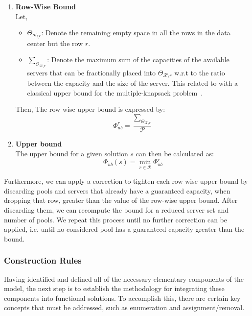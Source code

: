 \begin{enumerate}
  \item \textbf{Row-Wise Bound} \\
        Let,
        \begin{itemize}
          \item $\Theta_{\mathcal{R} \setminus r}$: Denote the remaining empty
                space in all the rows in the data center but the row $r$.
          \item $\sum_{\Theta_{\mathcal{R} \setminus r}}$: Denote the maximum
                sum of the capacities of the available servers that can be
                fractionally placed into $\Theta_{\mathcal{R} \setminus r}$ w.r.t to
                the ratio between the capacity and the size of the server. This related to
                with a classical upper bound for the multiple-knapsack problem~\cite{martello1981bound}.
        \end{itemize}
        Then,
        The row-wise upper bound is expressed by:
        \begin{equation}
          \Phi_{ub}^{r} = \frac{\sum_{\Theta_{\mathcal{R} \setminus r}}}{\mathcal{P}}
        \end{equation}
  \item \textbf{Upper bound}\\
        The upper bound for a given solution $s$ can then be calculated as:
        \begin{equation}
          \Phi_{ub}(s) = \min_{r \in \mathcal{R}} \Phi_{ub}^{r}
        \end{equation}
\end{enumerate}

Furthermore, we can apply a correction to tighten each row-wise upper bound by
discarding pools and servers that already have a guaranteed capacity, when
dropping that row, greater than the value of the row-wise upper bound. After
discarding them, we can recompute the bound for a reduced server set and number
of pools. We repeat this process until no further correction can be applied, i.e.
until no considered pool has a guaranteed capacity greater than the bound.

\subsubsection{Construction Rules}
\label{section:data-center-construction-rules}

Having identified and defined all of the necessary elementary components of the
model, the next step is to establish the methodology for integrating these
components into functional solutions. To accomplish this, there are certain key
concepts that must be addressed, such as enumeration and assignment/removal.

